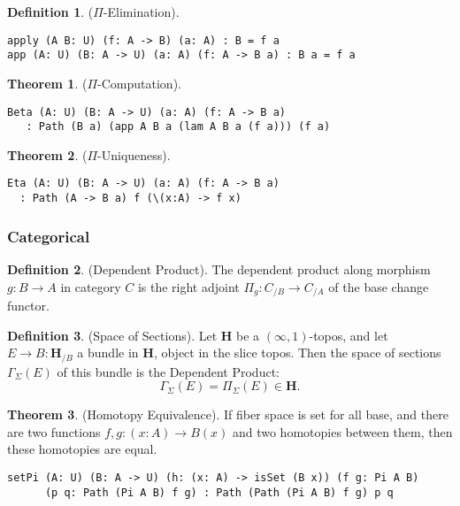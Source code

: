 \documentclass{article}
\theoremstyle{definition}
\newtheorem{theorem}{Theorem}
\newtheorem{definition}{Definition}
\begin{document}
\begin{definition} ($\Pi$-Elimination).
\begin{lstlisting}
apply (A B: U) (f: A -> B) (a: A) : B = f a
app (A: U) (B: A -> U) (a: A) (f: A -> B a) : B a = f a
\end{lstlisting}
\end{definition}

\begin{theorem} ($\Pi$-Computation).
\begin{lstlisting}
Beta (A: U) (B: A -> U) (a: A) (f: A -> B a)
   : Path (B a) (app A B a (lam A B a (f a))) (f a)
\end{lstlisting}
\end{theorem}

\begin{theorem} ($\Pi$-Uniqueness).
\begin{lstlisting}
Eta (A: U) (B: A -> U) (a: A) (f: A -> B a)
  : Path (A -> B a) f (\(x:A) -> f x)
\end{lstlisting}
\end{theorem}

\subsubsection{Categorical}

\begin{definition} (Dependent Product).
The dependent product along morphism $g: B \rightarrow A$ in category $C$ is the right
adjoint $\Pi_g : C_{/B} \rightarrow C_{/A}$ of the base change functor.
\end{definition}

\begin{definition} (Space of Sections).
Let $\mathbf{H}$ be a $(\infty,1)$-topos, and let $E \rightarrow B : \mathbf{H}_{/B}$ a bundle in
$\mathbf{H}$, object in the slice topos. Then the space of sections $\Gamma_\Sigma(E)$
of this bundle is the Dependent Product:
$$ \Gamma_\Sigma(E) = \Pi_\Sigma (E) \in \mathbf{H}. $$
\end{definition}

\begin{theorem} (Homotopy Equivalence).
If fiber space is set for all base, and
there are two functions $f,g : (x:A) \rightarrow B(x)$ and two
homotopies between them, then these homotopies are equal.
\begin{lstlisting}
setPi (A: U) (B: A -> U) (h: (x: A) -> isSet (B x)) (f g: Pi A B)
      (p q: Path (Pi A B) f g) : Path (Path (Pi A B) f g) p q
\end{lstlisting}
\end{theorem}
\end{document}
